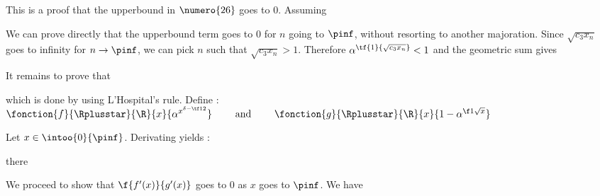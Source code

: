 \hypertarget{upperbound}{}
 
 This is a proof that the upperbound 
in $\numero{26}$ goes to 0. Assuming



\noindent We can prove directly that the upperbound term goes to 0 
for $n$ going to $\pinf$,
without resorting to another majoration.
Since $\sqrt{c_3 x_n}$ goes to infinity for $n \rightarrow \pinf$,
we can pick $n$ such that $\sqrt{c_3 x_n} > 1$. Therefore
$\alpha^{\tf{1}{\sqrt{c_3 x_n}}} < 1$ and the geometric sum gives


\noindent It remains to prove that 

which is done by using L'Hospital's rule.
Define :
\centers
    {$ \fonction
            {f}
            { \Rplusstar }
            { \R }
            { x }
            { \alpha^{ x^{ \delta - \tf12 } } }
      \qquad \text{ and } \qquad
      \fonction
        {g}
        { \Rplusstar }
        { \R }
        { x }
        {  1 - \alpha^{ \f1{ \sqrt{x} } } } $}

\noindent Let $x \in \intoo{0}{\pinf}$. Derivating yields :


\hypertarget{upperbound}{there}
We proceed to show that $\f{f'(x)}{g'(x)}$ goes to 0 as $x$ goes
to $\pinf$. We have



